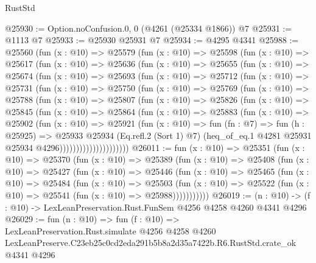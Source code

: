 \begin{lexlean}{RustStd}
\begin{coremodule}
@25930 := Option.noConfusion.{0, 0} (@4261 (@25334 @1866)) @7
@25931 := @1113 @7
@25933 := @25930 @25931 @7
@25934 := @4295 @4341
@25988 := @25560
    (fun (x : @10) =>
    @25579
      (fun (x : @10) =>
      @25598
        (fun (x : @10) =>
        @25617
          (fun (x : @10) =>
          @25636
            (fun (x : @10) =>
            @25655
              (fun (x : @10) =>
              @25674
                (fun (x : @10) =>
                @25693
                  (fun (x : @10) =>
                  @25712
                    (fun (x : @10) =>
                    @25731
                      (fun (x : @10) =>
                      @25750
                        (fun (x : @10) =>
                        @25769
                          (fun (x : @10) =>
                          @25788
                            (fun (x : @10) =>
                            @25807
                              (fun (x : @10) =>
                              @25826
                                (fun (x : @10) =>
                                @25845
                                  (fun (x : @10) =>
                                  @25864
                                    (fun (x : @10) =>
                                    @25883
                                      (fun (x : @10) =>
                                      @25902
                                        (fun (x : @10) =>
                                        @25921
                                          (fun (x : @10) =>
                                          fun (fn : @7) =>
                                          fun (h : @25925) =>
                                          @25933
                                            @25934
                                            (Eq.refl.{2} (Sort 1) @7)
                                            (heq_of_eq.{1}
                                              @4281
                                              @25931
                                              @25934
                                              @4296)))))))))))))))))))))
@26011 := fun (x : @10) =>
  @25351
    (fun (x : @10) =>
    @25370
      (fun (x : @10) =>
      @25389
        (fun (x : @10) =>
        @25408
          (fun (x : @10) =>
          @25427
            (fun (x : @10) =>
            @25446
              (fun (x : @10) =>
              @25465
                (fun (x : @10) =>
                @25484
                  (fun (x : @10) =>
                  @25503
                    (fun (x : @10) =>
                    @25522 (fun (x : @10) => @25541 (fun (x : @10) => @25988)))))))))))
@26019 := (n : @10) -> (f : @10) -> LexLeanPreservation.Rust.FunSem @4256 @4258 @4260 @4341 @4296
@26029 := fun (n : @10) =>
  fun (f : @10) =>
  LexLeanPreservation.Rust.simulate
    @4256
    @4258
    @4260
    LexLeanPreserve.C23eb25c0cd2eda291b5b8a2d35a7422b.R6.RustStd.crate_ok
    @4341
    @4296
\end{coremodule}
\end{lexlean}
